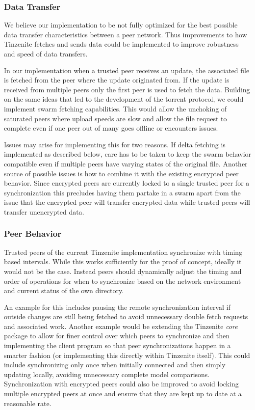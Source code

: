 \subsubsection{Data Transfer}
\label{subs:Data Transfer}

We believe our implementation to be not fully optimized for the best possible data transfer characteristics between a peer network.
Thus improvements to how Tinzenite fetches and sends data could be implemented to improve robustness and speed of data transfers.

In our implementation when a trusted peer receives an update, the associated file is fetched from the peer where the update originated from.
If the update is received from multiple peers only the first peer is used to fetch the data.
Building on the same ideas that led to the development of the torrent protocol, we could implement swarm fetching capabilities.
This would allow the unchoking of saturated peers where upload speeds are slow and allow the file request to complete even if one peer out of many goes offline or encounters issues.

Issues may arise for implementing this for two reasons.
If delta fetching is implemented as described below, care has to be taken to keep the swarm behavior compatible even if multiple peers have varying states of the original file.
Another source of possible issues is how to combine it with the existing encrypted peer behavior.
Since encrypted peers are currently locked to a single trusted peer for a synchronization this precludes having them partake in a swarm apart from the issue that the encrypted peer will transfer encrypted data while trusted peers will transfer unencrypted data.

\subsubsection{Peer Behavior}
\label{subs:Peer Behavior}

Trusted peers of the current Tinzenite implementation synchronize with timing based intervals.
While this works sufficiently for the proof of concept, ideally it would not be the case.
Instead peers should dynamically adjust the timing and order of operations for when to synchronize based on the network environment and current status of the own directory.

An example for this includes pausing the remote synchronization interval if outside changes are still being fetched to avoid unnecessary double fetch requests and associated work.
Another example would be extending the Tinzenite \emph{core} package to allow for finer control over which peers to synchronize and then implementing the client program so that peer synchronizations happen in a smarter fashion (or implementing this directly within Tinzenite itself).
This could include synchronizing only once when initially connected and then simply updating locally, avoiding unnecessary complete model comparisons.
Synchronization with encrypted peers could also be improved to avoid locking multiple encrypted peers at once and ensure that they are kept up to date at a reasonable rate.


